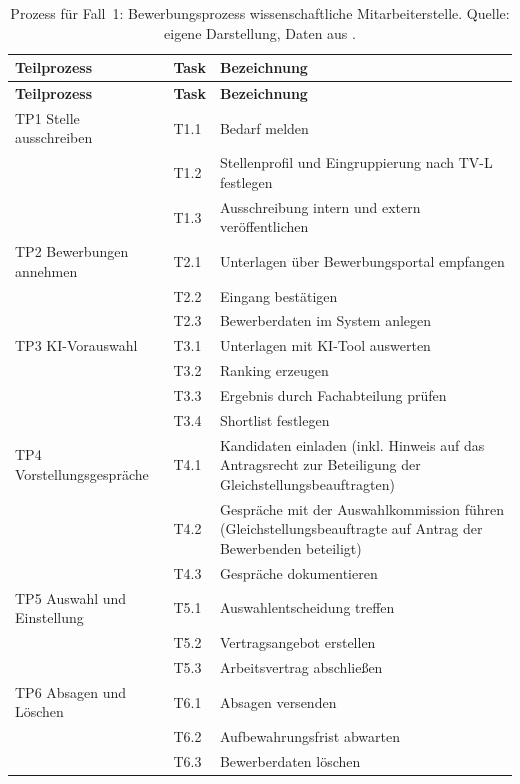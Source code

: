 \begin{small}
\begin{longtable}{@{}>{\raggedright\arraybackslash}p{4.2cm}>{\raggedright\arraybackslash}p{1.3cm}>{\raggedright\arraybackslash}p{9.0cm}@{}}
\caption[Prozess für Fall~1: Bewerbungsprozess wissenschaftliche Mitarbeiterstelle]{Prozess für Fall~1: Bewerbungsprozess wissenschaftliche Mitarbeiterstelle. Quelle: eigene Darstellung, Daten aus .}\label{tab:h1_prozess}\\
\toprule \textbf{Teilprozess} & \textbf{Task} & \textbf{Bezeichnung} \\ \midrule \endfirsthead
\toprule \textbf{Teilprozess} & \textbf{Task} & \textbf{Bezeichnung} \\ \midrule \endhead
\bottomrule \endfoot
TP1 Stelle ausschreiben & T1.1 & Bedarf melden \\
 & T1.2 & Stellenprofil und Eingruppierung nach TV-L festlegen \\
 & T1.3 & Ausschreibung intern und extern veröffentlichen \\
TP2 Bewerbungen annehmen & T2.1 & Unterlagen über Bewerbungsportal empfangen \\
 & T2.2 & Eingang bestätigen \\
 & T2.3 & Bewerberdaten im System anlegen \\
TP3 KI-Vorauswahl & T3.1 & Unterlagen mit KI-Tool auswerten \\
 & T3.2 & Ranking erzeugen \\
 & T3.3 & Ergebnis durch Fachabteilung prüfen \\
 & T3.4 & Shortlist festlegen \\
TP4 Vorstellungsgespräche & T4.1 & Kandidaten einladen (inkl. Hinweis auf das Antragsrecht zur Beteiligung der Gleichstellungsbeauftragten) \\
 & T4.2 & Gespräche mit der Auswahlkommission führen (Gleichstellungsbeauftragte auf Antrag der Bewerbenden beteiligt) \\
 & T4.3 & Gespräche dokumentieren \\
TP5 Auswahl und Einstellung & T5.1 & Auswahlentscheidung treffen \\
 & T5.2 & Vertragsangebot erstellen \\
 & T5.3 & Arbeitsvertrag abschließen \\
TP6 Absagen und Löschen & T6.1 & Absagen versenden \\
 & T6.2 & Aufbewahrungsfrist abwarten \\
 & T6.3 & Bewerberdaten löschen \\
\end{longtable}
\end{small}

